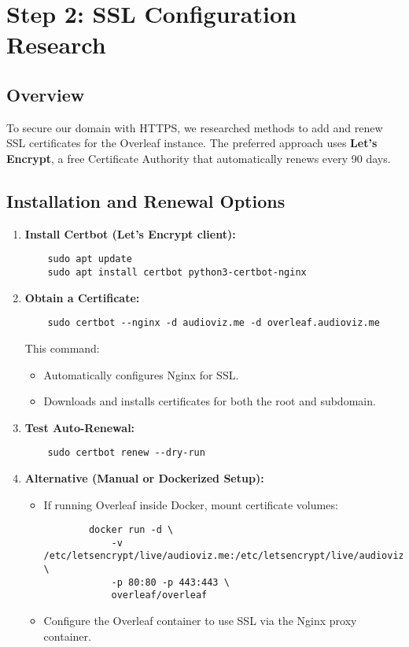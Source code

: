 \section{Step 2: SSL Configuration Research}

\subsection{Overview}
To secure our domain with HTTPS, we researched methods to add and renew SSL certificates for the Overleaf instance. The preferred approach uses \textbf{Let’s Encrypt}, a free Certificate Authority that automatically renews every 90 days.

\subsection{Installation and Renewal Options}
\begin{enumerate}
    \item \textbf{Install Certbot (Let’s Encrypt client):}
    \begin{verbatim}
    sudo apt update
    sudo apt install certbot python3-certbot-nginx
    \end{verbatim}

    \item \textbf{Obtain a Certificate:}
    \begin{verbatim}
    sudo certbot --nginx -d audioviz.me -d overleaf.audioviz.me
    \end{verbatim}
    This command:
    \begin{itemize}
        \item Automatically configures Nginx for SSL.
        \item Downloads and installs certificates for both the root and subdomain.
    \end{itemize}

    \item \textbf{Test Auto-Renewal:}
    \begin{verbatim}
    sudo certbot renew --dry-run
    \end{verbatim}

    \item \textbf{Alternative (Manual or Dockerized Setup):}
    \begin{itemize}
        \item If running Overleaf inside Docker, mount certificate volumes:
        \begin{verbatim}
        docker run -d \
            -v /etc/letsencrypt/live/audioviz.me:/etc/letsencrypt/live/audioviz.me \
            -p 80:80 -p 443:443 \
            overleaf/overleaf
        \end{verbatim}
        \item Configure the Overleaf container to use SSL via the Nginx proxy container.
    \end{itemize}
\end{enumerate}

